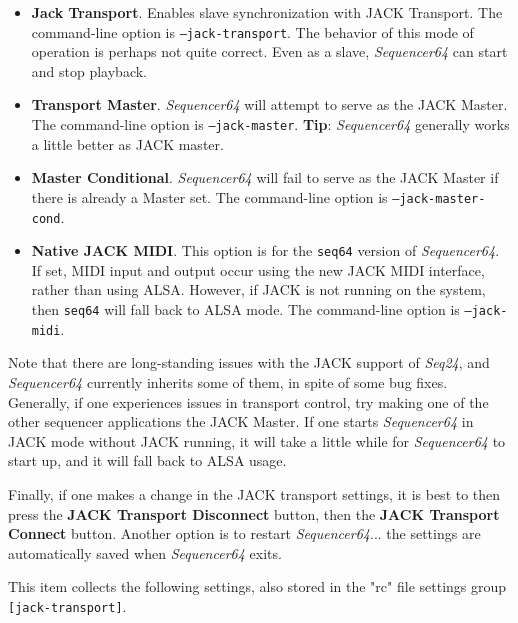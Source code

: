    \begin{itemize}
      \item \textbf{Jack Transport}.
         Enables slave synchronization with JACK Transport.
         The command-line option is \texttt{--jack-transport}.
         The behavior of this mode of operation is perhaps not quite
         correct.  Even as a slave, \textsl{Sequencer64} can start and
         stop playback.
      \item \textbf{Transport Master}.
         \textsl{Sequencer64} will attempt to serve as the JACK Master.
         The command-line option is \texttt{--jack-master}.
         \textbf{Tip}:
         \textsl{Sequencer64} generally works a little better as JACK
         master.
      \item \textbf{Master Conditional}.
         \textsl{Sequencer64} will fail to serve as the JACK Master if there is
         already a Master set.
         The command-line option is \texttt{--jack-master-cond}.
      \item \textbf{Native JACK MIDI}.
         This option is for the \texttt{seq64} version of
         \textsl{Sequencer64}.
         If set, MIDI input and output occur using the new JACK MIDI interface,
         rather than using ALSA.  However, if JACK is not running on the
         system, then \texttt{seq64} will fall back to ALSA mode.
         The command-line option is \texttt{--jack-midi}.
   \end{itemize}

   Note that there are long-standing issues with the JACK support of
   \textsl{Seq24}, and \textsl{Sequencer64} currently inherits some of them,
   in spite of some bug fixes.  Generally, if one experiences issues in
   transport control, try making one of the other sequencer applications the
   JACK Master.
   If one starts \textsl{Sequencer64} in JACK mode without JACK running,
   it will take a little while for \textsl{Sequencer64} to start up, and it
   will fall back to ALSA usage.

   Finally, if one makes a change in the JACK transport settings, it is best to
   then press the \textbf{JACK Transport Disconnect} button, then the
   \textbf{JACK Transport Connect} button.  Another option is to restart
   \textsl{Sequencer64}... the settings are automatically saved when
   \textsl{Sequencer64} exits.

   This item collects the following settings, also stored in the "rc" file
   settings group \texttt{[jack-transport]}.


